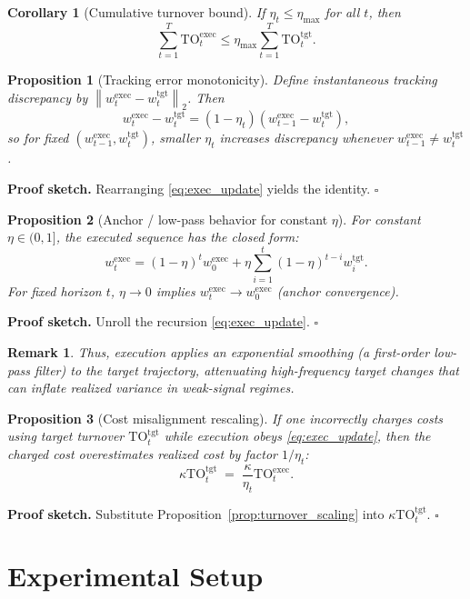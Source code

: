 \documentclass[10pt,twocolumn]{article}
\newtheorem{proposition}{Proposition}
\newtheorem{corollary}{Corollary}
\newtheorem{remark}{Remark}
\newcommand{\wexec}{w^{\mathrm{exec}}}
\newcommand{\wtgt}{w^{\mathrm{tgt}}}
\newcommand{\TOexec}{\mathrm{TO}^{\mathrm{exec}}}
\newcommand{\TOtgt}{\mathrm{TO}^{\mathrm{tgt}}}
\newcommand{\kappaTC}{\kappa}
\newcommand{\normtwo}[1]{\left\lVert #1 \right\rVert_2}
\begin{document}
\begin{corollary}[Cumulative turnover bound]\label{cor:cum_turnover}
If $\eta_t\le \eta_{\max}$ for all $t$, then
\[
\sum_{t=1}^T \TOexec_t \le \eta_{\max}\sum_{t=1}^T \TOtgt_t.
\]
\end{corollary}

\begin{proposition}[Tracking error monotonicity]\label{prop:tracking}
Define instantaneous tracking discrepancy by $\normtwo{\wexec_t-\wtgt_t}$. Then
\[
\wexec_t-\wtgt_t = (1-\eta_t)(\wexec_{t-1}-\wtgt_t),
\]
so for fixed $(\wexec_{t-1},\wtgt_t)$, smaller $\eta_t$ increases discrepancy whenever $\wexec_{t-1}\neq \wtgt_t$.
\end{proposition}
\noindent\textbf{Proof sketch.} Rearranging \eqref{eq:exec_update} yields the identity. \hfill$\square$

\begin{proposition}[Anchor / low-pass behavior for constant $\eta$]\label{prop:anchor}
For constant $\eta\in(0,1]$, the executed sequence has the closed form:
\[
\wexec_t = (1-\eta)^t \wexec_0 + \eta\sum_{i=1}^{t} (1-\eta)^{t-i}\wtgt_i.
\]
For fixed horizon $t$, $\eta\to0$ implies $\wexec_t\to \wexec_0$ (anchor convergence).
\end{proposition}
\noindent\textbf{Proof sketch.} Unroll the recursion \eqref{eq:exec_update}. \hfill$\square$
\begin{remark}
Thus, execution applies an exponential smoothing (a first-order low-pass filter) to the target trajectory, attenuating high-frequency target changes that can inflate realized variance in weak-signal regimes.
\end{remark}

\begin{proposition}[Cost misalignment rescaling]\label{prop:cost_misalignment}
If one incorrectly charges costs using target turnover $\TOtgt_t$ while execution obeys \eqref{eq:exec_update}, then the charged cost overestimates realized cost by factor $1/\eta_t$:
\[
\kappaTC \TOtgt_t \;=\; \frac{\kappaTC}{\eta_t}\TOexec_t.
\]
\end{proposition}
\noindent\textbf{Proof sketch.} Substitute Proposition~\ref{prop:turnover_scaling} into $\kappaTC\TOtgt_t$. \hfill$\square$

\section{Experimental Setup}
\label{sec:exp}
\end{document}
